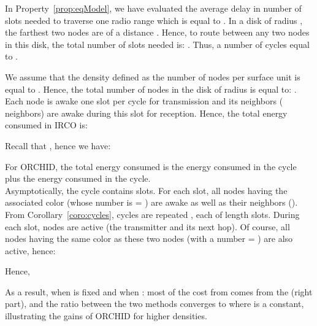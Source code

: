 In Property~\ref{prop:eqModel}, we have evaluated the average delay in number of slots needed to traverse one radio range which is equal to . In a disk of radius , the farthest two nodes are of a distance . Hence, to route between any two nodes
in this disk, the total number of slots needed is: . Thus, a number of cycles equal to .

We assume that the density defined as the number of nodes per surface unit is equal to . Hence, the total number of nodes in the disk of radius  is equal to: . Each node is awake one slot per cycle for transmission and its neighbors ( neighbors) are awake during this slot for reception. Hence, the total energy consumed in IRCO is:

Recall that , hence we have:


\begin{comment}
During any slot, all nodes having the associated color are awake as well as their neighbors ( nodes). The number of nodes of a given color (slot) is equal to the density of a color which is given by  multiplied by the total number of nodes in the disk (). The total energy consumed in IRCO is:

Recall that , hence we have:

\end{comment}
\begin{comment}
Using this result, we can estimate the number of cycles needed by IRCO to route between any pair of nodes in the disk of radius.
Since one node plus all its neighbors is active at every slot, this yield an estimate of the energy consumption
of IRCO:

\end{comment}

For ORCHID, the total energy consumed is the energy consumed in the  cycle plus the energy consumed in the  cycle.  \\
Asymptotically, the  cycle contains  slots. For each slot, all nodes having the associated color (whose number is = ) are awake as well as their neighbors (). \\ From Corollary~\ref{coro:cycles},  cycles are repeated , each of length  slots. During each  slot,  nodes are active (the transmitter and its next hop). Of course, all nodes having the same color as these two nodes (with a number = ) are also active, hence:

Hence,


As a result, when  is fixed and when : most of
the cost from  comes from the  (right part),
and the ratio
between the  two methods converges to 
 where  is a constant, illustrating the gains of ORCHID for higher densities.















